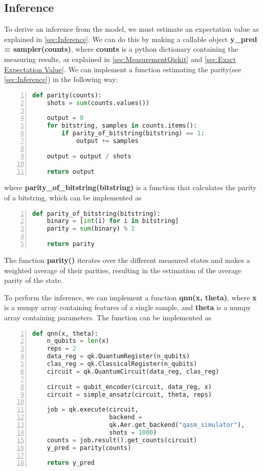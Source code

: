 \subsection{Inference}\label{sec:InferenceImplementation}
To derive an inference from the model, we must estimate an expectation value as explained in \autoref{sec:Inference}. We can do this by making a callable object \textbf{y\_pred = sampler(counts)}, where \textbf{counts} is a python dictionary containing the measuring results, as explained in \autoref{sec:MeasurementQiskit} and \autoref{sec:Exact Expectation Value}. We can implement a function estimating the parity(see \autoref{sec:Inference}) in the following way:

\begin{lstlisting}[language=python, numbers=left]
def parity(counts):
    shots = sum(counts.values())
    
    output = 0
    for bitstring, samples in counts.items():
        if parity_of_bitstring(bitstring) == 1:
            output += samples

    output = output / shots

    return output
\end{lstlisting}
where \textbf{parity\_of\_bitstring(bitstring)} is a function that calculates the parity of a bitstring, which can be implemented as 
\begin{lstlisting}[language=python, numbers=left]
def parity_of_bitstring(bitstring):
    binary = [int(i) for i in bitstring]
    parity = sum(binary) % 2
    
    return parity
\end{lstlisting}

The function \textbf{parity()} iterates over the different measured states and makes a weighted average of their parities, resulting in the estimation of the average parity of the state.

To perform the inference, we can implement a function \textbf{qnn(x, theta)}, where \textbf{x} is a numpy array containing features of a single sample, and \textbf{theta} is a numpy array containing parameters. The function can be implemented as 

\begin{lstlisting}[language=python, numbers=left]
def qnn(x, theta):
    n_qubits = len(x)
    reps = 2
    data_reg = qk.QuantumRegister(n_qubits)
    clas_reg = qk.ClassicalRegister(n_qubits)
    circuit = qk.QuantumCircuit(data_reg, clas_reg)
    
    circuit = qubit_encoder(circuit, data_reg, x)
    circuit = simple_ansatz(circuit, theta, reps)

    job = qk.execute(circuit, 
                     backend = 
                     qk.Aer.get_backend("qasm_simulator"),
                     shots = 1000)
    counts = job.result().get_counts(circuit)
    y_pred = parity(counts)
    
    return y_pred
\end{lstlisting}


